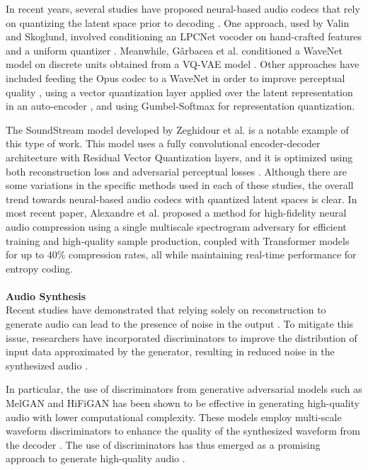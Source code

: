 \documentclass[12pt]{report}
\begin{document}
In recent years, several studies have proposed neural-based audio codecs that rely on quantizing the latent space prior to decoding \cite{skoglund2019waveform, valin2019neural, garbacea2019vector, lim2020high, kleijn2018straight, kleijn2021deep, jayashankar2022role, jiang2022new}. One approach, used by Valin and Skoglund, involved conditioning an LPCNet vocoder on hand-crafted features and a uniform quantizer \cite{valin2019neural}. Meanwhile, Gârbacea et al. conditioned a WaveNet model on discrete units obtained from a VQ-VAE model \cite{garbacea2019vector}. Other approaches have included feeding the Opus codec to a WaveNet in order to improve perceptual quality \cite{skoglund2019waveform}, using a vector quantization layer applied over the latent representation in an auto-encoder \cite{jayashankar2022role, jiang2022new}, and using Gumbel-Softmax for representation quantization. 

The SoundStream model developed by Zeghidour et al. is a notable example of this type of work. This model uses a fully convolutional encoder-decoder architecture with Residual Vector Quantization layers, and it is optimized using both reconstruction loss and adversarial perceptual losses \cite{zeghidour2021soundstream}. Although there are some variations in the specific methods used in each of these studies, the overall trend towards neural-based audio codecs with quantized latent spaces is clear. In most recent paper, Alexandre et al. proposed a method for high-fidelity neural audio compression using a single multiscale spectrogram adversary for efficient training and high-quality sample production, coupled with Transformer models for up to 40\% compression rates, all while maintaining real-time performance for entropy coding. \cite{defossez2022high} \\\\
\textbf{Audio Synthesis} \\
Recent studies have demonstrated that relying solely on reconstruction to generate audio can lead to the presence of noise in the output \cite{fang2020vq}. To mitigate this issue, researchers have incorporated discriminators to improve the distribution of input data approximated by the generator, resulting in reduced noise in the synthesized audio \cite{donahue2019adversarial}.

In particular, the use of discriminators from generative adversarial models such as MelGAN \cite{kumar2019melgan} and HiFiGAN \cite{kwon2020hifi} has been shown to be effective in generating high-quality audio with lower computational complexity. These models employ multi-scale waveform discriminators to enhance the quality of the synthesized waveform from the decoder \cite{kumar2019melgan}. The use of discriminators has thus emerged as a promising approach to generate high-quality audio \cite{kwon2020hifi}.
\\
\end{document}
